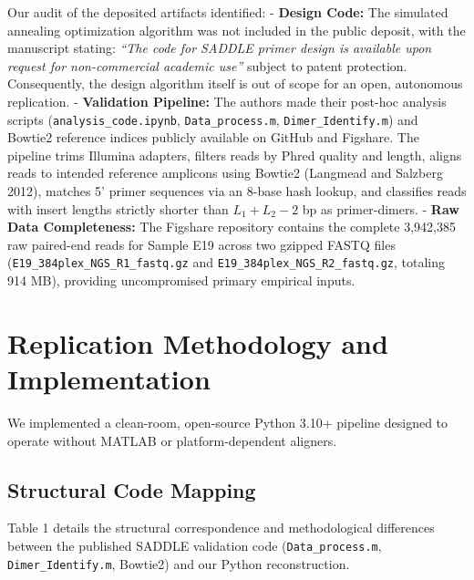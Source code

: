 \documentclass[
]{article}
\begin{document}
Our audit of the deposited artifacts identified: - \textbf{Design Code:}
The simulated annealing optimization algorithm was not included in the
public deposit, with the manuscript stating: \emph{``The code for SADDLE
primer design is available upon request for non-commercial academic
use''} subject to patent protection. Consequently, the design algorithm
itself is out of scope for an open, autonomous replication. -
\textbf{Validation Pipeline:} The authors made their post-hoc analysis
scripts (\texttt{analysis\_code.ipynb}, \texttt{Data\_process.m},
\texttt{Dimer\_Identify.m}) and Bowtie2 reference indices publicly
available on GitHub and Figshare. The pipeline trims Illumina adapters,
filters reads by Phred quality and length, aligns reads to intended
reference amplicons using Bowtie2 (Langmead and Salzberg 2012), matches
5' primer sequences via an 8-base hash lookup, and classifies reads with
insert lengths strictly shorter than \(L_1 + L_2 - 2\) bp as
primer-dimers. - \textbf{Raw Data Completeness:} The Figshare repository
contains the complete 3,942,385 raw paired-end reads for Sample E19
across two gzipped FASTQ files (\texttt{E19\_384plex\_NGS\_R1\_fastq.gz}
and \texttt{E19\_384plex\_NGS\_R2\_fastq.gz}, totaling 914 MB),
providing uncompromised primary empirical inputs.

\section{Replication Methodology and
Implementation}\label{replication-methodology-and-implementation}

We implemented a clean-room, open-source Python 3.10+ pipeline designed
to operate without MATLAB or platform-dependent aligners.

\subsection{Structural Code Mapping}\label{structural-code-mapping}

Table 1 details the structural correspondence and methodological
differences between the published SADDLE validation code
(\texttt{Data\_process.m}, \texttt{Dimer\_Identify.m}, Bowtie2) and our
Python reconstruction.
\end{document}
